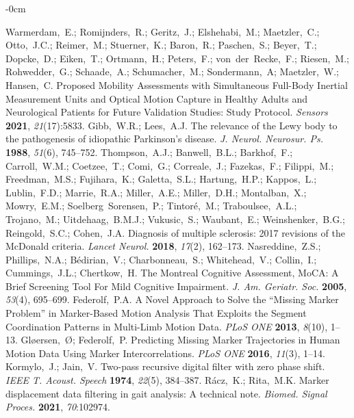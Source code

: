 \documentclass[sensors,article,submit,pdftex,moreauthors]{Definitions/mdpi}
\begin{document}
\begin{adjustwidth}{-\extralength}{0cm}
\begin{thebibliography}{999}
	Warmerdam,~E.; Romijnders,~R.; Geritz,~J.; Elshehabi,~M.; Maetzler,~C.; Otto,~J.C.; Reimer,~M.; Stuerner,~K.; Baron,~R.; Paschen,~S.; Beyer,~T.; Dopcke,~D.; Eiken,~T.; Ortmann,~H.; Peters,~F.; von~der~Recke,~F.; Riesen,~M.; Rohwedder,~G.; Schaade,~A.; Schumacher,~M.; Sondermann,~A; Maetzler,~W.; Hansen,~C. Proposed Mobility Assessments with Simultaneous Full-Body Inertial Measurement Units and Optical Motion Capture in Healthy Adults and Neurological Patients for Future Validation Studies: Study Protocol. {\em Sensors} {\bf 2021}, {\em 21}(17):5833.
	Gibb,~W.R.; Lees,~A.J. The relevance of the Lewy body to the pathogenesis of idiopathic Parkinson's disease. {\em J. Neurol. Neurosur. Ps.} {\bf 1988}, {\em 51}(6), 745--752.
	Thompson,~A.J.; Banwell,~B.L.; Barkhof,~F.; Carroll,~W.M.; Coetzee,~T.; Comi,~G.; Correale,~J.; Fazekas,~F.; Filippi,~M.; Freedman,~M.S.; Fujihara,~K.; Galetta,~S.L.; Hartung,~H.P.; Kappos,~L.; Lublin,~F.D.; Marrie,~R.A.; Miller,~A.E.; Miller,~D.H.; Montalban,~X.; Mowry,~E.M.; Soelberg~Sorensen,~P.; Tintor\'{e},~M.; Traboulsee,~A.L.; Trojano,~M.; Uitdehaag,~B.M.J.; Vukusic,~S.; Waubant,~E.; Weinshenker,~B.G.; Reingold,~S.C.; Cohen,~J.A. Diagnosis of multiple sclerosis: 2017 revisions of the McDonald criteria. {\em Lancet Neurol.} {\bf 2018}, {\em 17}(2), 162--173.
	Nasreddine,~Z.S.; Phillips,~N.A.; B\'{e}dirian,~V.; Charbonneau,~S.; Whitehead,~V.; Collin,~I.; Cummings,~J.L.; Chertkow,~H. The Montreal Cognitive Assessment, MoCA: A Brief Screening Tool For Mild Cognitive Impairment. {\em J. Am. Geriatr. Soc.} {\bf 2005}, {\em 53}(4), 695--699.
	Federolf,~P.A. A Novel Approach to Solve the “Missing Marker Problem” in Marker-Based Motion Analysis That Exploits the Segment Coordination Patterns in Multi-Limb Motion Data. {\em PLoS ONE} {\bf 2013}, {\em 8}(10), 1--13.
	Gl{\o}ersen,~{\O}; Federolf,~P. Predicting Missing Marker Trajectories in Human Motion Data Using Marker Intercorrelations. {\em PLoS ONE} {\bf 2016}, {\em 11}(3), 1--14.
	Kormylo,~J.; Jain,~V. Two-pass recursive digital filter with zero phase shift. {\em IEEE T. Acoust. Speech} {\bf 1974}, {\em 22}(5), 384--387.
	R\'{a}cz,~K.; Rita,~M.K. Marker displacement data filtering in gait analysis: A technical note. {\em Biomed. Signal Proces.} {\bf 2021}, {\em 70}:102974.

\end{thebibliography}
\end{adjustwidth}
\end{document}
